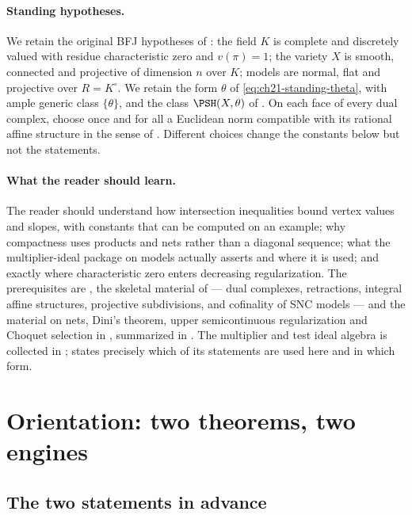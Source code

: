 \paragraph{Standing hypotheses.}
We retain the original BFJ hypotheses of : the
field \(K\) is complete and discretely valued with residue characteristic
zero and \(v(\pi)=1\); the variety \(X\) is smooth, connected and projective
of dimension \(n\) over \(K\); models are normal, flat and projective over
\(R=K^\circ\).  We retain the form \(\theta\) of
\eqref{eq:ch21-standing-theta}, with ample generic class \(\{\theta\}\), and
the class \(\PSH(X,\theta)\) of .  On each face of
every dual complex, choose once and for all a Euclidean norm compatible with
its rational affine structure in the sense of
.  Different choices change the constants below but
not the statements.

\paragraph{What the reader should learn.}
The reader should understand how intersection inequalities bound vertex
values and slopes, with constants that can be computed on an example; why
compactness uses products and nets rather than a diagonal sequence; what
the multiplier-ideal package on models actually asserts and where it is
used; and exactly where characteristic zero enters decreasing
regularization.  The prerequisites are
, the skeletal material of
 --- dual complexes, retractions, integral affine
structures, projective subdivisions, and cofinality of SNC models --- and
the material on nets, Dini's theorem, upper semicontinuous regularization
and Choquet selection in , summarized in
.  The multiplier and test ideal algebra is collected in
;  states precisely which of its
statements are used here and in which form.

\section{Orientation: two theorems, two engines}
\label{sec:ch22-orientation}

\subsection{The two statements in advance}
\label{sec:ch22-statements-preview}

